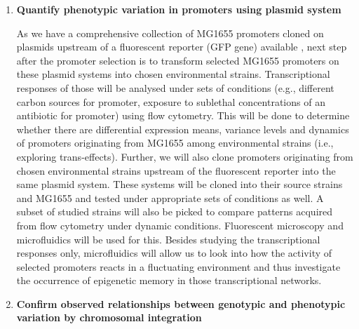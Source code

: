 \begin{enumerate}[font=\bfseries]
\begin{enumerate}[font=\bfseries]
        \item \textbf{Quantify phenotypic variation in promoters using plasmid system}
        
        As we have a comprehensive collection of MG1655 promoters cloned on plasmids upstream of a fluorescent reporter (GFP gene) available \cite{zaslaver2006comprehensive}, next step after the promoter selection is to transform selected MG1655 promoters on these plasmid systems into chosen environmental  strains.
        Transcriptional responses of those will be analysed under sets of conditions (e.g., different carbon sources for  promoter, exposure to sublethal concentrations of an antibiotic for  promoter) using flow cytometry.
        This will be done to determine whether there are differential expression means, variance levels and dynamics of promoters originating from MG1655 among environmental strains (i.e., exploring trans-effects).
        Further, we will also clone promoters originating from chosen environmental strains upstream of the fluorescent reporter into the same plasmid system.
        These  systems will be cloned into their source strains and MG1655 and tested under appropriate sets of conditions as well.
        A subset of studied strains will also be picked to compare patterns acquired from flow cytometry under dynamic conditions.
        Fluorescent microscopy and microfluidics will be used for this.
        Besides studying the transcriptional responses only, microfluidics will allow us to look into how the activity of selected promoters reacts in a fluctuating environment and thus investigate the occurrence of epigenetic memory in those transcriptional networks.
        
        \item \textbf{Confirm observed relationships between genotypic and phenotypic variation by chromosomal integration}
        

\end{enumerate}
\end{enumerate}
